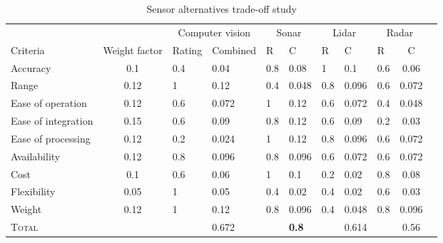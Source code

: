 
\begin{table}[htbp]
	\centering
	\begin{tabular}{lc|ll|ll|ll|lcl}
		
		\hline
					&					&	\multicolumn{2}{c|}{Computer vision}&	\multicolumn{2}{c|}{Sonar}	&	\multicolumn{2}{c|}{Lidar}	&	\multicolumn{2}{c}{Radar}	\\
		Criteria	&	Weight factor	&	Rating	&	Combined				&	R	&	C					&	R	&	C					&	R	&	C					\\
		\hline
		Accuracy			&	0.1	&	0.4	&	0.04	&	0.8	&	0.08&	1	&	0.1	&	0.6	&	0.06	\\
		Range				&	0.12&	1	&	0.12	&	0.4	&	0.048&	0.8	&	0.096&	0.6	&	0.072	\\
		Ease of operation	&	0.12&	0.6	&	0.072	&	1	&	0.12&	0.6	&	0.072&	0.4	&	0.048	\\
		Ease of integration	&	0.15&	0.6	&	0.09	&	0.8	&	0.12&	0.6	&	0.09&	0.2	&	0.03	\\
		Ease of processing	&	0.12&	0.2	&	0.024	&	1	&	0.12&	0.8	&	0.096&	0.6	&	0.072	\\
		Availability		&	0.12&	0.8	&	0.096	&	0.8	&	0.096&	0.6	&	0.072&	0.6	&	0.072	\\
		Cost				&	0.1	&	0.6	&	0.06	&	1	&	0.1	&	0.2	&	0.02&	0.8	&	0.08	\\
		Flexibility			&	0.05&	1	&	0.05	&	0.4	&	0.02&	0.4	&	0.02&	0.6	&	0.03	\\
		Weight				&	0.12&	1	&	0.12	&	0.8	&	0.096&	0.4	&	0.048&	0.8	&	0.096	\\
		\hline
		\scshape Total		&		&		&	0.672	&		&\bf 0.8&		&	0.614&		&	0.56	\\

	\end{tabular}
	\caption{Sensor alternatives trade-off study}
	\label{tab:tradeoff}
\end{table}
